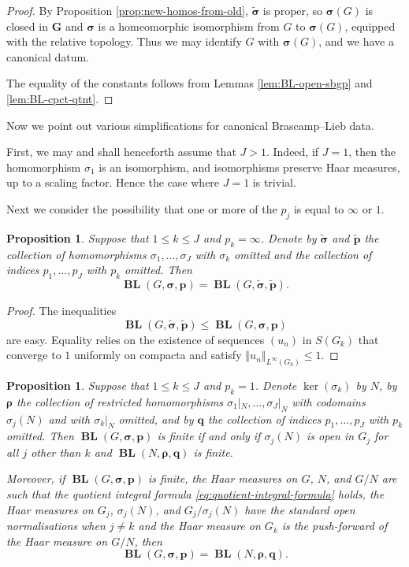 \documentclass[12pt,twoside,a4paper]{amsart}
\newtheorem{prop}[thm]{Proposition}%
\theoremstyle{definition}
\theoremstyle{remark}
\numberwithin{equation}{section}
\newcommand{\BL}{\operatorname{\mathbf{BL}}}
\newcommand{\bss}{\boldsymbol{\sigma}}
\newcommand{\bsts}{\boldsymbol{\tilde\sigma}}
\newcommand{\bsrho}{\boldsymbol{\rho}}
\newcommand{\bsp}{\boldsymbol{p}}
\newcommand{\bstp}{\boldsymbol{\tilde{p}}}
\newcommand{\bsq}{\boldsymbol{q}}
\newcommand{\bsG}{\boldsymbol{G}}
\newcommand{\norm}[1]{\left\Vert #1 \right\Vert}
\begin{document}
\begin{proof}
By Proposition \ref{prop:new-homos-from-old}, $\bsts$ is proper, so $\bss(G)$ is closed in $\bsG$ and $\bss$ is a homeomorphic isomorphism from $G$ to $\bss(G)$, equipped with the relative topology.  
Thus we may identify $G$ with $\bss(G)$, and we have a canonical datum.

The equality of the constants follows from Lemmas \ref{lem:BL-open-sbgp} and \ref{lem:BL-cpct-qtnt}.
\end{proof}



Now we point out various simplifications for canonical Brascamp--Lieb data.

First, we may and shall henceforth assume that $J > 1$.
Indeed, if $J=1$, then the homomorphism $\sigma_1$ is an isomorphism, and isomorphisms preserve Haar measures, up to a scaling factor.
Hence the case where $J=1$ is trivial.

Next we consider the possibility that one or more of the $p_j$ is equal to $\infty$ or $1$.

\begin{prop}\label{prop:pk=infty}
Suppose that $1 \leq k \leq J$ and $p_k = \infty$.
Denote by $\bsts$ and $\bstp$ the collection of homomorphisms $\sigma_1, \dots, \sigma_J$ with $\sigma_k$ omitted and the collection of indices $p_1, \dots, p_J$ with $p_k$ omitted.
Then
\[
\BL(G, \bss, \bsp)
= \BL(G, \bsts, \bstp) .
\]
\end{prop}

\begin{proof}
The inequalities 
\[
\BL(G, \bsts, \bstp) \leq \BL(G, \bss, \bsp)
\] 
are easy.  
Equality relies on the existence of sequences $(u_n)$ in $S(G_k)$ that converge to $1$ uniformly on compacta and satisfy $\norm{u_n}_{L^\infty(G_k)} \leq 1$.
\end{proof}

\begin{prop}\label{prop:pk=1}
Suppose that $1 \leq k \leq J$ and $p_k = 1$. 
Denote $\ker(\sigma_k)$ by $N$, by $\bsrho$ the collection of restricted homomorphisms $\sigma_1|_{N}, \dots, \sigma_J|_{N}$ with codomains $\sigma_j(N)$ and with $\sigma_k|_{N}$ omitted, and by $\bsq$ the collection of indices $p_1, \dots, p_J$  with $p_k$ omitted.
Then $\BL(G, \bss, \bsp)$ is finite if and only if $\sigma_j(N)$ is open in $G_j$ for all $j$ other than $k$ and $\BL(N, \bsrho, \bsq)$ is finite.

Moreover, if $\BL(G, \bss, \bsp)$ is finite, the Haar measures on $G$, $N$, and $G/N$ are such that the quotient integral formula \eqref{eq:quotient-integral-formula} holds, the Haar measures on $G_j$, $\sigma_j(N)$, and $G_j/\sigma_j(N)$ have the standard open normalisations when $j \neq k$ and the Haar measure on $G_k$ is the push-forward of the Haar measure on $G/N$, then
\[
\BL(G, \bss, \bsp)
= \BL(N, \bsrho, \bsq).
\]
\end{prop}
\end{document}
